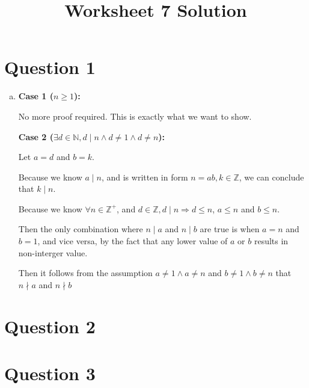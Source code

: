 \documentclass[12pt]{article}
\begin{document}
\title{Worksheet 7 Solution}
\maketitle

\section*{Question 1}
\begin{enumerate}[a.]
    \item

    \textbf{Case 1 ($n \geq 1$):}

    \bigskip

    No more proof required. This is exactly what we want to show.

    \bigskip

    \textbf{Case 2 ($\exists d \in \mathbb{N}, d \mid n \land d \neq 1 \land d \neq n$):}

    \bigskip

    Let $a = d$ and $b = k$.

    \bigskip

    Because we know $a \mid n$, and is written in form $n = ab, k \in \mathbb{Z}$,
    we can conclude that $k \mid n$.

    \bigskip

    Because we know $\forall n \in \mathbb{Z}^{+}$, and $d \in \mathbb{Z}, d \mid
    n \Rightarrow d \leq n$, $a \leq n$ and $b \leq n$.

    \bigskip

    Then the only combination where $n \mid a$ and $n \mid b$ are true is when
    $a = n$ and $b = 1$, and vice versa, by the fact that any lower value of $a$
    or $b$ results in non-interger value.

    \bigskip

    Then it follows from the assumption $a \neq 1 \land a \neq n$ and $b \neq 1 \land b \neq n$
    that $n \nmid a$ and $n \nmid b$



\end{enumerate}

\section*{Question 2}

\section*{Question 3}
\end{document}
